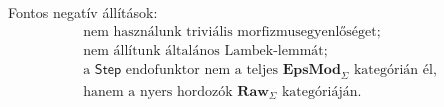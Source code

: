 \documentclass[11pt]{article}
\newcommand{\EpsMod}{\mathbf{EpsMod}_{\Sigma}}
\newcommand{\Raw}{\mathbf{Raw}_{\Sigma}}
\newcommand{\Step}{\mathsf{Step}}
\begin{document}
Fontos negatív állítások:
\[
\begin{gathered}
\text{nem használunk triviális morfizmusegyenlőséget;}\\
\text{nem állítunk általános Lambek-lemmát;}\\
\text{a }\Step\text{ endofunktor nem a teljes }\EpsMod\text{ kategórián él,}\\
\text{hanem a nyers hordozók }\Raw\text{ kategóriáján.}
\end{gathered}
\]
\end{document}
